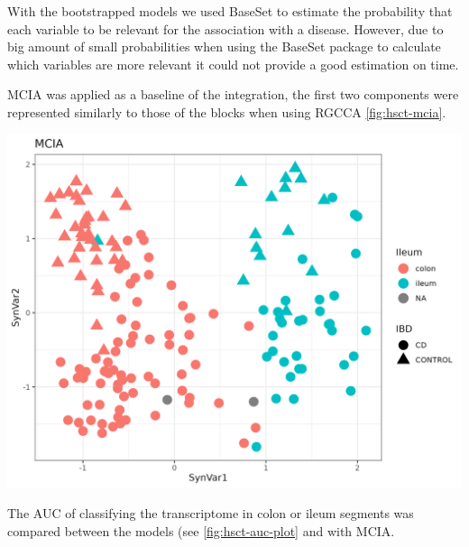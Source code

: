 \documentclass[
  12pt,
  a4paper,
  twoside,
  openright]{book}
\let\origfigure\figure
\let\endorigfigure\endfigure
\renewenvironment{figure}[1][2] {
    \expandafter\origfigure\expandafter[!htp]
} {
    \endorigfigure
}
\begin{document}
With the bootstrapped models we used BaseSet to estimate the probability that each variable to be relevant for the association with a disease.
However, due to big amount of small probabilities when using the BaseSet package to calculate which variables are more relevant it could not provide a good estimation on time.

MCIA was applied as a baseline of the integration, the first two components were represented similarly to those of the blocks when using RGCCA \ref{fig:hsct-mcia}.

\begin{figure}
\includegraphics[width=1\linewidth]{images/hsct-mcia} \caption[MCIA dimensions in the HSCT dataset.]{MCIA dimensions in the HSCT dataset. MCIA first two synthetic variables. In red circles the colon and in blue triangles the ileum.}\label{fig:hsct-mcia}
\end{figure}

The AUC of classifying the transcriptome in colon or ileum segments was compared between the models (see \ref{fig:hsct-auc-plot} and with MCIA.
\end{document}
